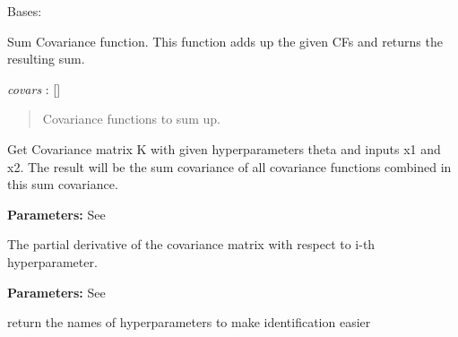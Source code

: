 \documentclass[letterpaper,10pt,english]{sphinxmanual}
\begin{document}
\begin{fulllineitems}
\label{covars:pygp.covar.combinators.SumCF}
Bases: 

Sum Covariance function. This function adds
up the given CFs and returns the resulting sum.

\emph{covars} : {[}{\hyperref[covars:pygp.covar.CovarianceFunction]{}}{]}
\begin{quote}

Covariance functions to sum up.
\end{quote}

\begin{fulllineitems}
\label{covars:pygp.covar.combinators.SumCF.K}
Get Covariance matrix K with given hyperparameters
theta and inputs x1 and x2. The result
will be the sum covariance of all covariance
functions combined in this sum covariance.

\textbf{Parameters:}
See {\hyperref[covars:pygp.covar.CovarianceFunction]{}}

\end{fulllineitems}


\begin{fulllineitems}
\label{covars:pygp.covar.combinators.SumCF.Kgrad_theta}
The partial derivative of the covariance matrix with
respect to i-th hyperparameter.

\textbf{Parameters:}
See {\hyperref[covars:pygp.covar.CovarianceFunction]{}}

\end{fulllineitems}


\begin{fulllineitems}
\label{covars:pygp.covar.combinators.SumCF.get_hyperparameter_names}
return the names of hyperparameters to make identification easier

\end{fulllineitems}


\end{fulllineitems}
\end{document}
